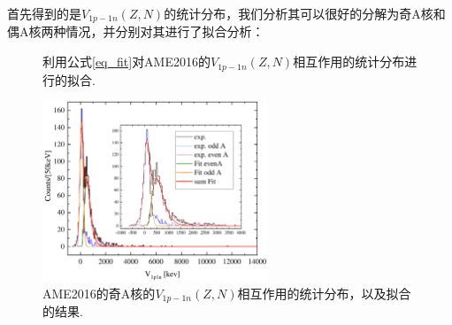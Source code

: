 首先得到的是$V_{1p-1n}(Z,N)$的统计分布，我们分析其可以很好的分解为奇A核和偶A核两种情况，并分别对其进行了拟合分析：
\begin{figure}[H]
\centering
{}
\qquad
{}
\caption{利用公式\ref{eq_fit}对AME2016的$V_{1p-1n}(Z,N)$相互作用的统计分布进行的拟合.\label{fig_YE3FitV1p2n_1}}
\end{figure}
\begin{figure}[H]
\centering
\includegraphics[width=0.6\textwidth]{figure/YE3fiteV1p1n50.pdf}
\caption{AME2016的奇A核的$V_{1p-1n}(Z,N)$相互作用的统计分布，以及拟合的结果.\label{fig_YE3fiteV1p1n50}}
\end{figure}

